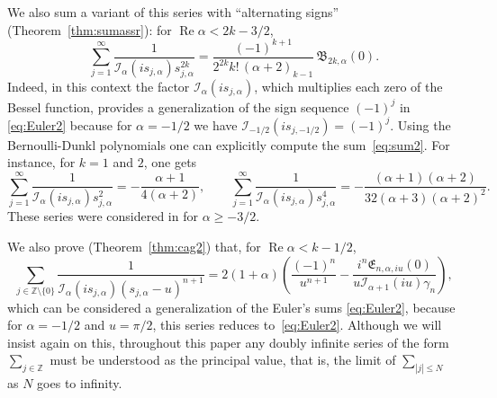 \documentclass[10pt,a4paper]{article}
\theoremstyle{plain}
\theoremstyle{definition}
\numberwithin{equation}{section} %
\newcommand{\I}{\mathcal{I}}
\newcommand{\B}{\mathfrak{B}}
\newcommand{\E}{\mathfrak{E}}
\newcommand{\ZZ}{\mathbb{Z}}
\newcommand{\ZZO}{\mathbb{Z} \setminus \{0\}}
\newcommand{\cc}{\gamma}
\renewcommand{\Re}{\operatorname{Re}}
\begin{document}
We also sum a variant of this series with ``alternating signs'' (Theorem~\ref{thm:sumassr}): for $\Re \alpha < 2k -3/2$,
\begin{equation}
\label{eq:sum2}
  \sum_{j=1}^\infty \frac{1}{\I_{\alpha}(is_{j,\alpha})s_{j,\alpha}^{2k}}
  = \frac{(-1)^{k+1}}{2^{2k}k!\,(\alpha+2)_{k-1}} \,\B_{2k,\alpha}(0).
\end{equation}
Indeed, in this context the factor $\I_{\alpha}(is_{j,\alpha})$, which multiplies each zero of the Bessel function, provides a generalization of the sign sequence $(-1)^j$ in \eqref{eq:Euler2} because for $\alpha=-1/2$ we have $\I_{-1/2}(is_{j,-1/2})=(-1)^j$. Using the Bernoulli-Dunkl polynomials one can explicitly compute the sum~\eqref{eq:sum2}.
For instance, for $k=1$ and $2$, one gets
\[
  \sum_{j=1}^\infty \frac{1}{\I_{\alpha}(is_{j,\alpha})s_{j,\alpha}^{2}}
  = -\frac{\alpha+1}{4(\alpha+2)},
  \qquad
  \sum_{j=1}^\infty \frac{1}{\I_{\alpha}(is_{j,\alpha})s_{j,\alpha}^{4}}
  = -\frac{(\alpha+1)(\alpha+2)}{32(\alpha+3)(\alpha+2)^2}.
\]
These series were considered in \cite{Sne} for $\alpha\ge -3/2$.

We also prove (Theorem~\ref{thm:cag2}) that, for $\Re \alpha < k -1/2$,
\[
  \sum_{j\in \ZZO} \frac{1}{\I_\alpha(is_{j,\alpha})(s_{j,\alpha}-u)^{n+1}}
  = 2(1+\alpha) \left(\frac{(-1)^n}{u^{n+1}}
  - \frac{i^n\E_{n,\alpha,iu}(0)}{u\I_{\alpha+1}(iu)\cc_n}\right),
\]
which can be considered a generalization of the Euler's sums \eqref{eq:Euler2}, because for $\alpha=-1/2$ and $u=\pi/2$, this series reduces to~\eqref{eq:Euler2}. Although we will insist again on this, throughout this paper any doubly infinite series of the form $\sum_{j\in \ZZ}$ must be understood as the principal value, that is, the limit of $\sum_{|j|\leq N}$ as $N$ goes to infinity.
\end{document}
